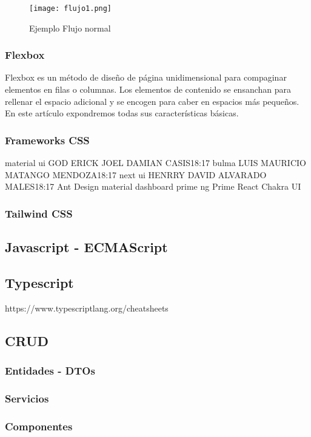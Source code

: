 \begin{figure}[H]
	\center
	\texttt{[image: flujo1.png]}
	\caption{Ejemplo Flujo normal}
	\label{fig:super}
\end{figure}


\subsubsection{Flexbox}

Flexbox es un método de diseño de página unidimensional para compaginar elementos en filas o columnas. Los elementos de contenido se ensanchan para rellenar el espacio adicional y se encogen para caber en espacios más pequeños. En este artículo expondremos todas sus características básicas.


\subsubsection{Frameworks CSS}

material ui GOD
ERICK JOEL DAMIAN CASIS18:17
bulma 
LUIS MAURICIO MATANGO MENDOZA18:17
next ui
HENRRY DAVID ALVARADO MALES18:17
Ant Design
material dashboard
prime ng
Prime React
Chakra UI



\subsubsection{Tailwind CSS}
\subsection{Javascript - ECMAScript}
\subsection{Typescript}
https://www.typescriptlang.org/cheatsheets

\subsection{CRUD}
\subsubsection{Entidades - DTOs}
\subsubsection{Servicios}
\subsubsection{Componentes}
